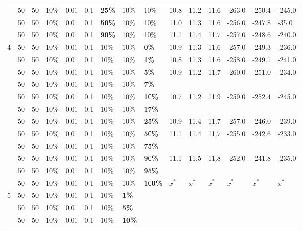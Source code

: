 \begin{table}
\begin{tabular}{|l|l|l|l|l|l|l|l|l||l|l|l|l|l|l|}
    ~ & 50 & 50 & 10\% & 0.01 & 0.1 & \textbf{25\%} & 10\% & 10\% & 10.8 & 11.2 & 11.6 & -263.0 & -250.4 & -245.0 \\
    ~ & 50 & 50 & 10\% & 0.01 & 0.1 & \textbf{50\%} & 10\% & 10\% & 11.0 & 11.3 & 11.6 & -256.0 & -247.8 & -35.0 \\
    ~ & 50 & 50 & 10\% & 0.01 & 0.1 & \textbf{90\%} & 10\% & 10\% & 11.1 & 11.4 & 11.7 & -257.0 & -248.6 & -240.0 \\
    \hline
    4 & 50 & 50 & 10\% & 0.01 & 0.1 & 10\% & 10\% & \textbf{0\%} & 10.9 & 11.3 & 11.6 & -257.0 & -249.3 & -236.0 \\
    ~ & 50 & 50 & 10\% & 0.01 & 0.1 & 10\% & 10\% & \textbf{1\%} & 10.8 & 11.3 & 11.6 & -258.0 & -249.1 & -241.0 \\
    ~ & 50 & 50 & 10\% & 0.01 & 0.1 & 10\% & 10\% & \textbf{5\%} &  10.9 & 11.2 & 11.7 & -260.0 & -251.0 & -234.0 \\
    ~ & 50 & 50 & 10\% & 0.01 & 0.1 & 10\% & 10\% & \textbf{7\%} & ~ & ~ & ~ & ~ & ~ & ~ \\
    ~ & 50 & 50 & 10\% & 0.01 & 0.1 & 10\% & 10\% & \textbf{10\%} & 10.7 & 11.2 & 11.9 & -259.0 & -252.4 & -245.0 \\
    ~ & 50 & 50 & 10\% & 0.01 & 0.1 & 10\% & 10\% & \textbf{17\%} & ~ & ~ & ~ & ~ & ~ & ~ \\
    ~ & 50 & 50 & 10\% & 0.01 & 0.1 & 10\% & 10\% & \textbf{25\%} & 10.9 & 11.4 & 11.7 & -257.0 & -246.0 & -239.0 \\
    ~ & 50 & 50 & 10\% & 0.01 & 0.1 & 10\% & 10\% & \textbf{50\%} & 11.1 & 11.4 & 11.7 & -255.0 & -242.6 & -233.0 \\
    ~ & 50 & 50 & 10\% & 0.01 & 0.1 & 10\% & 10\% & \textbf{75\%} &  ~ &  ~ &  ~ &  ~ &  ~ &  ~ \\
    ~ & 50 & 50 & 10\% & 0.01 & 0.1 & 10\% & 10\% & \textbf{90\%} & 11.1 & 11.5 & 11.8 & -252.0 & -241.8 & -235.0 \\
    ~ & 50 & 50 & 10\% & 0.01 & 0.1 & 10\% & 10\% & \textbf{95\%} & ~ & ~ & ~ & ~ & ~ & ~ \\
    ~ & 50 & 50 & 10\% & 0.01 & 0.1 & 10\% & 10\% & \textbf{100\%} & $x^*$ & $x^*$ & $x^*$ & $x^*$ & $x^*$ & $x^*$ \\
    \hline
    5 & 50 & 50 & 10\% & 0.01 & 0.1 & 10\% & \textbf{1\%} & ~ & ~ & ~ & ~ & ~ & ~ & ~ \\
    ~ & 50 & 50 & 10\% & 0.01 & 0.1 & 10\% & \textbf{5\%} & ~ & ~ & ~ & ~ & ~ & ~ & ~ \\
    ~ & 50 & 50 & 10\% & 0.01 & 0.1 & 10\% & \textbf{10\%} & ~ & ~ & ~ & ~ & ~ & ~ & ~ \\

\end{tabular}
\end{table}
